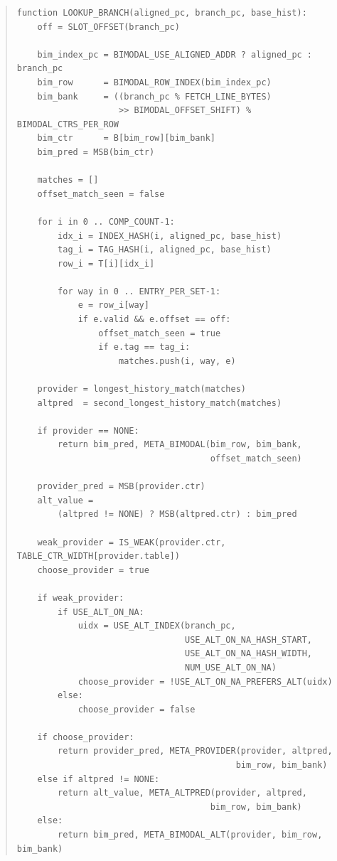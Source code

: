 \documentclass[11pt,a4paper]{article}
\begin{document}
\begin{quote}
\footnotesize
\begin{verbatim}
function LOOKUP_BRANCH(aligned_pc, branch_pc, base_hist):
    off = SLOT_OFFSET(branch_pc)

    bim_index_pc = BIMODAL_USE_ALIGNED_ADDR ? aligned_pc : branch_pc
    bim_row      = BIMODAL_ROW_INDEX(bim_index_pc)
    bim_bank     = ((branch_pc % FETCH_LINE_BYTES)
                    >> BIMODAL_OFFSET_SHIFT) % BIMODAL_CTRS_PER_ROW
    bim_ctr      = B[bim_row][bim_bank]
    bim_pred = MSB(bim_ctr)

    matches = []
    offset_match_seen = false

    for i in 0 .. COMP_COUNT-1:
        idx_i = INDEX_HASH(i, aligned_pc, base_hist)
        tag_i = TAG_HASH(i, aligned_pc, base_hist)
        row_i = T[i][idx_i]

        for way in 0 .. ENTRY_PER_SET-1:
            e = row_i[way]
            if e.valid && e.offset == off:
                offset_match_seen = true
                if e.tag == tag_i:
                    matches.push(i, way, e)

    provider = longest_history_match(matches)
    altpred  = second_longest_history_match(matches)

    if provider == NONE:
        return bim_pred, META_BIMODAL(bim_row, bim_bank,
                                      offset_match_seen)

    provider_pred = MSB(provider.ctr)
    alt_value =
        (altpred != NONE) ? MSB(altpred.ctr) : bim_pred

    weak_provider = IS_WEAK(provider.ctr, TABLE_CTR_WIDTH[provider.table])
    choose_provider = true

    if weak_provider:
        if USE_ALT_ON_NA:
            uidx = USE_ALT_INDEX(branch_pc,
                                 USE_ALT_ON_NA_HASH_START,
                                 USE_ALT_ON_NA_HASH_WIDTH,
                                 NUM_USE_ALT_ON_NA)
            choose_provider = !USE_ALT_ON_NA_PREFERS_ALT(uidx)
        else:
            choose_provider = false

    if choose_provider:
        return provider_pred, META_PROVIDER(provider, altpred,
                                           bim_row, bim_bank)
    else if altpred != NONE:
        return alt_value, META_ALTPRED(provider, altpred,
                                      bim_row, bim_bank)
    else:
        return bim_pred, META_BIMODAL_ALT(provider, bim_row, bim_bank)
\end{verbatim}
\end{quote}
\end{document}
